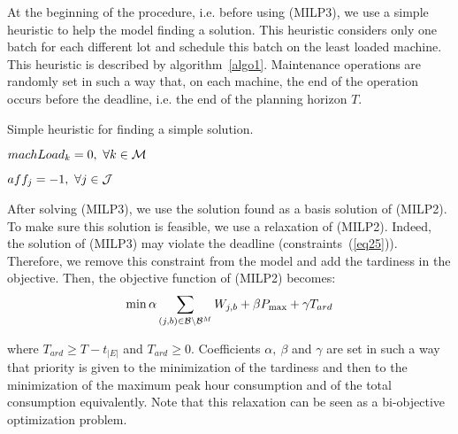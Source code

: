 At the beginning of the procedure, i.e. before using (MILP3), we
use a simple heuristic to help the model finding a solution. This
heuristic considers only one batch for each different lot and schedule
this batch on the least loaded machine. This heuristic is described by
algorithm~\ref{algo1}. Maintenance operations are randomly set in such
a way that, on each machine, the end of the operation occurs before
the deadline, i.e. the end of the planning horizon $T$.

\begin{algorithm}%
  \caption{Simple heuristic for finding a simple solution.}
\label{algo1}
  $machLoad_k=0,\ \forall k \in {\cal M}$ 
  
  $aff_j=-1,\ \forall j \in {\cal J} $

\end{algorithm}


After solving (MILP3), we use the solution found as a
basis solution of (MILP2). To make sure this solution is feasible,
we use a relaxation of (MILP2). Indeed, the solution of (MILP3) may
violate the deadline (constraints~(\ref{eq25})). Therefore, we remove
this constraint from the model and add the tardiness in the
objective. Then, the objective function of (MILP2) becomes:
\begin{eqnarray}
\min \alpha\sum_{(j,b)\in{\cal B}\setminus{\cal B}^M}W_{j,b} + \beta
P_{\max} + \gamma T_{ard}\label{ct:objsee1000}
\end{eqnarray}

where $T_{ard} \ge T-t_{|E|}$ and $T_{ard} \ge 0$. Coefficients
$\alpha,\ \beta$ and $\gamma$ are set in such a way that priority is
given to the minimization of the tardiness and then to the
minimization of the maximum peak hour consumption and of the total
consumption equivalently. Note that this relaxation can be seen 
as a bi-objective optimization problem.


